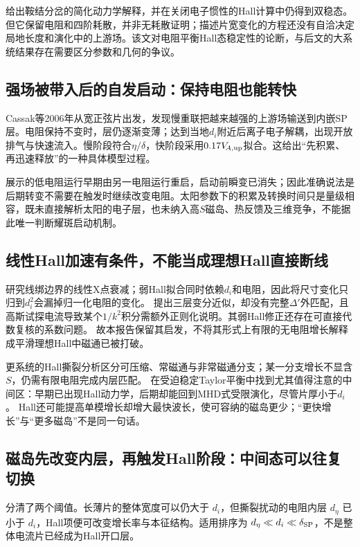 \documentclass[UTF8,a4paper,11pt,openany,fontset=fandol]{ctexbook}
\begin{document}
\citet{Cassak2010}给出鞍结分岔的简化动力学解释，并在关闭电子惯性的Hall计算中仍得到双稳态。但它保留电阻和四阶耗散，并非无耗散证明；描述片宽变化的方程还没有自洽决定局地长度和演化中的上游场。该文对电阻平衡Hall态稳定性的论断，与后文的大系统结果存在需要区分参数和几何的争议。

\subsection{强场被带入后的自发启动：保持电阻也能转快}
Cassak等2006年从宽正弦片出发，发现慢重联把越来越强的上游场输送到内嵌SP层。电阻保持不变时，层仍逐渐变薄；达到当地$d_i$附近后离子电子解耦，出现开放排气与快速流入。慢阶段符合$\eta/\delta$，快阶段采用$0.17V_{\!A,\rm up}$拟合。这给出“先积累、再迅速释放”的一种具体模型过程。\citep{Cassak2006}

展示的低电阻运行早期由另一电阻运行重启，启动前瞬变已消失；因此准确说法是后期转变不需要在触发时继续改变电阻。太阳参数下的积累及转换时间只是量级相容，既未直接解析太阳的电子层，也未纳入高$S$磁岛、热反馈及三维竞争，不能据此唯一判断耀斑启动机制。

\subsection{线性Hall加速有条件，不能当成理想Hall直接断线}
\citet{L123}研究线绑边界的线性X点衰减；弱Hall拟合同时依赖$d_i$和电阻，因此将尺寸变化只归到$d_i^2$会漏掉归一化电阻的变化。
\citet{L122}提出三层变分近似，却没有完整$\Delta'$外匹配，且高斯试探电流导致某个$1/k^2$积分需额外正则化说明。其弱Hall修正还存在可直接代数复核的系数问题。
故本报告保留其启发，不将其形式上有限的无电阻增长解释成平滑理想Hall中磁通已被打破。

更系统的Hall撕裂分析\citep{L250}区分可压缩、常磁通与非常磁通分支；某一分支增长不显含$S$，仍需有限电阻完成内层匹配。
\citet{L238}在受迫稳定Taylor平衡中找到尤其值得注意的中间区：早期已出现Hall动力学，后期却能回到MHD式受限演化，尽管片厚小于$d_i$。
Hall还可能提高单模增长却增大最快波长，使可容纳的磁岛更少；“更快增长”与“更多磁岛”不是同一句话。

\subsection{磁岛先改变内层，再触发Hall阶段：中间态可以往复切换}
\citet{Baalrud2011}分清了两个阈值。长薄片的整体宽度可以仍大于 $d_i$，但撕裂扰动的电阻内层 $d_\eta$ 已小于 $d_i$，Hall项便可改变增长率与本征结构。适用排序为 $d_\eta\ll d_i\ll\delta_{\rm SP}$，不是整体电流片已经成为Hall开口层。
\end{document}
